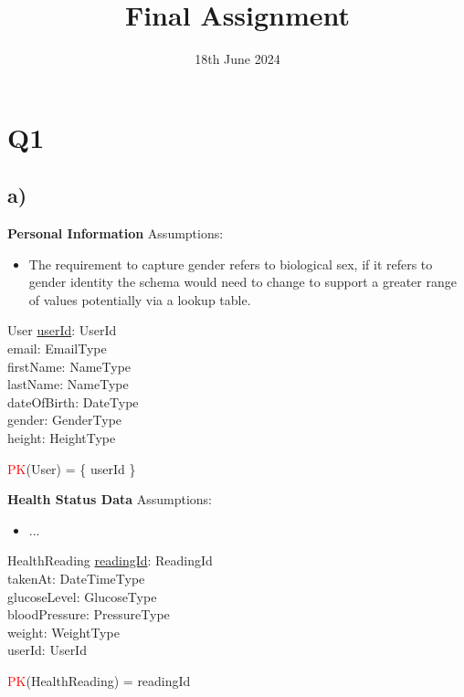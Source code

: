 \documentclass{article}
\title{Final Assignment}
\date{\vspace{-1.0cm}18th June 2024}
\begin{document}
\maketitle

\section*{Q1}

\subsection*{\small a)}


\textbf{Personal Information}
\newline \newline Assumptions:
\begin{itemize}
  \item The requirement to capture gender refers to biological sex, if it refers to gender identity the schema would need to change to support a greater range of values potentially via a lookup table.
\end{itemize}
\begin{schema}{User}
	\underline{userId}: UserId \\
    email: EmailType \\
	firstName: NameType \\
	lastName: NameType \\
    dateOfBirth: DateType \\
    gender: GenderType \\
    height: HeightType \\ 
\end{schema}
\begin{zed}
\textcolor{red}{PK}(User) = \{ userId \} \\
\end{zed}

\vspace{0.2cm}
\hspace{-0.5cm}\textbf{Health Status Data}
\newline \newline Assumptions:
\begin{itemize}
  \item ... 
\end{itemize}

\begin{schema}{HealthReading}
	\underline{readingId}: ReadingId \\
    takenAt: DateTimeType \\
    glucoseLevel: GlucoseType \\
    bloodPressure: PressureType \\ 
    weight: WeightType \\
    userId: UserId \\
\end{schema}
\begin{zed}
\textcolor{red}{PK}(HealthReading) = { readingId } \\
\end{zed}
    
\end{document}
